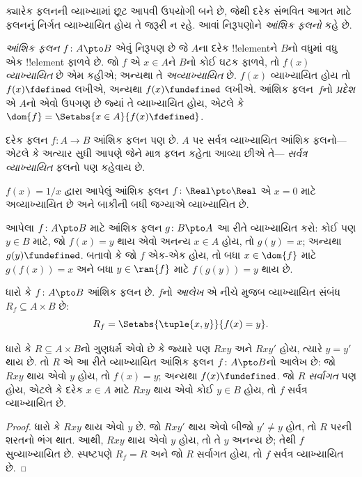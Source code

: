 \documentclass[../../../include/open-logic-section]{subfiles}
\begin{document}


\begin{explain}
ક્યારેક ફલનની વ્યાખ્યામાં છૂટ આપવી ઉપયોગી બને છે,
જેથી દરેક સંભવિત આગત માટે ફલનનું નિર્ગત વ્યાખ્યાયિત
હોય તે જરૂરી ન રહે. આવાં નિરૂપણોને
\emph{આંશિક ફલનો} કહે છે.
\end{explain}

\begin{defn}
\emph{આંશિક ફલન} $f \colon A \pto B$ એવું નિરૂપણ છે
જે $A$ના દરેક !!{element}ને $B$નો વધુમાં વધુ એક
!!{element} ફાળવે છે. જો $f$ એ $x \in A$ને $B$નો
કોઈ ઘટક ફાળવે, તો $f(x)$ \emph{વ્યાખ્યાયિત} છે
એમ કહીએ; અન્યથા તે \emph{અવ્યાખ્યાયિત} છે.
$f(x)$ વ્યાખ્યાયિત હોય તો $f(x) \fdefined$ લખીએ,
અન્યથા $f(x) \fundefined$ લખીએ. આંશિક ફલન~$f$નો
\emph{પ્રદેશ} એ $A$નો એવો ઉપગણ છે જ્યાં તે
વ્યાખ્યાયિત હોય, એટલે કે
$\dom{f} = \Setabs{x \in A}{f(x) \fdefined}$.
\end{defn}

\begin{ex}
દરેક ફલન $f\colon A \to B$ આંશિક ફલન પણ છે.
$A$ પર સર્વત્ર વ્યાખ્યાયિત આંશિક ફલનો---એટલે કે
અત્યાર સુધી આપણે જેને માત્ર ફલન કહેતા આવ્યા છીએ તે---
\emph{સર્વત્ર વ્યાખ્યાયિત} ફલનો પણ કહેવાય છે.
\end{ex}

\begin{ex}
$f(x) = 1/x$ દ્વારા આપેલું આંશિક ફલન
$f \colon \Real \pto \Real$ એ $x = 0$ માટે
અવ્યાખ્યાયિત છે અને બાકીની બધી જગ્યાએ વ્યાખ્યાયિત છે.
\end{ex}

\begin{prob}
આપેલા $f\colon A \pto B$ માટે આંશિક ફલન
$g\colon B \pto
A$ આ રીતે વ્યાખ્યાયિત કરો: કોઈ પણ $y \in B$ માટે,
જો $f(x) = y$ થાય એવો અનન્ય $x \in A$ હોય,
તો $g(y) = x$; અન્યથા $g(y) \fundefined$.
બતાવો કે જો $f$ એક-એક હોય, તો બધા $x \in \dom{f}$
માટે $g(f(x)) = x$ અને બધા $y \in \ran{f}$ માટે
$f(g(y)) = y$ થાય છે.
\end{prob}

\begin{defn}[આંશિક ફલનનો આલેખ]
ધારો કે $f\colon A \pto B$ આંશિક ફલન છે.
$f$નો \emph{આલેખ} એ નીચે મુજબ વ્યાખ્યાયિત સંબંધ
$R_f \subseteq A \times B$ છે:
\[
R_f = \Setabs{\tuple{x,y}}{f(x) = y}.
\]
\end{defn}

\begin{prop}
ધારો કે $R \subseteq A \times B$નો ગુણધર્મ એવો છે કે
જ્યારે પણ $Rxy$ અને $Rxy'$ હોય, ત્યારે $y = y'$ થાય છે.
તો $R$ એ આ રીતે વ્યાખ્યાયિત આંશિક ફલન
$f\colon A \pto B$નો આલેખ છે: જો $Rxy$ થાય એવો $y$
હોય, તો $f(x) = y$; અન્યથા $f(x) \fundefined$.
જો $R$ \emph{સર્વાગત} પણ હોય, એટલે કે દરેક $x \in A$
માટે $Rxy$ થાય એવો કોઈ $y \in B$ હોય, તો $f$
સર્વત્ર વ્યાખ્યાયિત છે.
\end{prop}

\begin{proof}
ધારો કે $Rxy$ થાય એવો $y$ છે. જો $Rxy'$ થાય એવો
બીજો $y'
\neq y$ હોત, તો $R$ પરની શરતનો ભંગ થાત.
આથી, $Rxy$ થાય એવો $y$ હોય, તો તે $y$ અનન્ય છે;
તેથી $f$ સુવ્યાખ્યાયિત છે. સ્પષ્ટપણે $R_f = R$
અને જો $R$ સર્વાગત હોય, તો $f$ સર્વત્ર વ્યાખ્યાયિત છે.
\end{proof}
\end{document}
